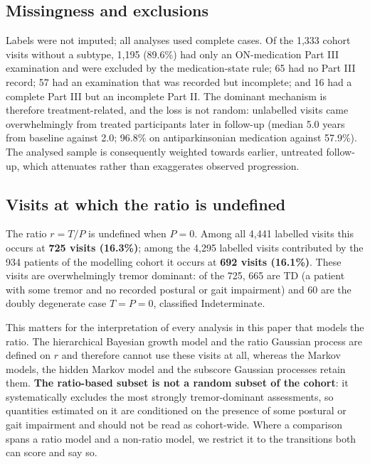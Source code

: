 \documentclass[11pt]{article}
\begin{document}
\subsection{Missingness and exclusions}
Labels were not imputed; all analyses used complete cases. Of the 1,333 cohort
visits without a subtype, 1,195 (89.6\%) had only an ON-medication Part III
examination and were excluded by the medication-state rule; 65 had no Part III
record; 57 had an examination that was recorded but incomplete; and 16 had a
complete Part III but an incomplete Part II. The dominant mechanism is therefore
treatment-related, and the loss is not random: unlabelled visits came
overwhelmingly from treated participants later in follow-up (median 5.0 years
from baseline against 2.0; 96.8\% on antiparkinsonian medication against
57.9\%). The analysed sample is consequently weighted towards earlier, untreated
follow-up, which attenuates rather than exaggerates observed progression.

\subsection{Visits at which the ratio is undefined}
\label{sec:undefined}
The ratio $r = T/P$ is undefined when $P = 0$. Among all 4,441 labelled visits
this occurs at \textbf{725 visits (16.3\%)}; among the 4,295 labelled visits
contributed by the 934 patients of the modelling cohort it occurs at
\textbf{692 visits (16.1\%)}. These visits are overwhelmingly tremor dominant:
of the 725, 665 are TD (a patient with some tremor and no recorded postural or
gait impairment) and 60 are the doubly degenerate case $T = P = 0$, classified
Indeterminate.

This matters for the interpretation of every analysis in this paper that models
the ratio. The hierarchical Bayesian growth model and the ratio Gaussian process
are defined on $r$ and therefore cannot use these visits at all, whereas the
Markov models, the hidden Markov model and the subscore Gaussian processes
retain them. \textbf{The ratio-based subset is not a random subset of the
cohort}: it systematically excludes the most strongly tremor-dominant
assessments, so quantities estimated on it are conditioned on the presence of
some postural or gait impairment and should not be read as cohort-wide. Where a
comparison spans a ratio model and a non-ratio model, we restrict it to the
transitions both can score and say so.

\end{document}
